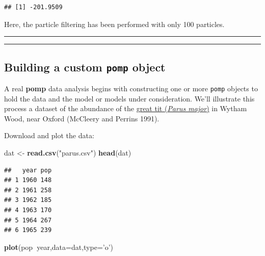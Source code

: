 \documentclass[]{article}
\newenvironment{Shaded}{\begin{snugshade}}{\end{snugshade}}
\newcommand{\KeywordTok}[1]{\textcolor[rgb]{0.13,0.29,0.53}{\textbf{#1}}}
\newcommand{\DataTypeTok}[1]{\textcolor[rgb]{0.13,0.29,0.53}{#1}}
\newcommand{\StringTok}[1]{\textcolor[rgb]{0.31,0.60,0.02}{#1}}
\newcommand{\OperatorTok}[1]{\textcolor[rgb]{0.81,0.36,0.00}{\textbf{#1}}}
\newcommand{\NormalTok}[1]{#1}
\begin{document}
\begin{verbatim}
## [1] -201.9509
\end{verbatim}

Here, the particle filtering has been performed with only 100 particles.

\begin{center}\rule{0.5\linewidth}{\linethickness}\end{center}

\begin{center}\rule{0.5\linewidth}{\linethickness}\end{center}

\subsection{\texorpdfstring{Building a custom \texttt{pomp}
object}{Building a custom pomp object}}\label{building-a-custom-pomp-object}

A real \textbf{pomp} data analysis begins with constructing one or more
\texttt{pomp} objects to hold the data and the model or models under
consideration. We'll illustrate this process a dataset of the abundance
of the \href{https://en.wikipedia.org/wiki/Great_tit}{great tit
(\emph{Parus major})} in Wytham Wood, near Oxford (McCleery and Perrins
1991).

Download and plot the data:

\begin{Shaded}
\begin{Highlighting}[]
\NormalTok{dat <-}\StringTok{ }\KeywordTok{read.csv}\NormalTok{(}\StringTok{"parus.csv"}\NormalTok{)}
\KeywordTok{head}\NormalTok{(dat)}
\end{Highlighting}
\end{Shaded}

\begin{verbatim}
##   year pop
## 1 1960 148
## 2 1961 258
## 3 1962 185
## 4 1963 170
## 5 1964 267
## 6 1965 239
\end{verbatim}

\begin{Shaded}
\begin{Highlighting}[]
\KeywordTok{plot}\NormalTok{(pop}\OperatorTok{~}\NormalTok{year,}\DataTypeTok{data=}\NormalTok{dat,}\DataTypeTok{type=}\StringTok{'o'}\NormalTok{)}
\end{Highlighting}
\end{Shaded}
\end{document}
